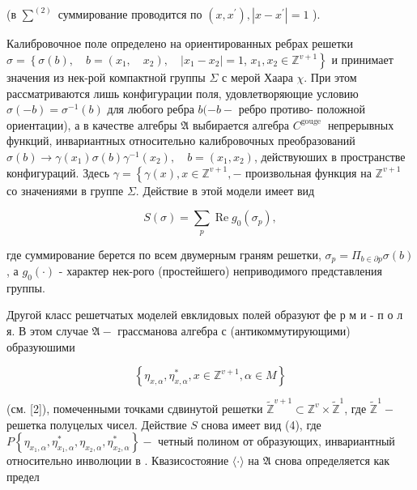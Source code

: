 \documentclass[10pt]{article}
\begin{document}
(в $\sum^{(2)}$ суммирование проводится по $\left(x, x^{\prime}\right),\left|x-x^{\prime}\right|=1$ ).



Калибровочное поле определено на ориентированных ребрах решетки $\sigma=\left\{\sigma(b), \quad b=\left(x_{1}, \quad x_{2}\right), \quad\left|x_{1}-x_{2}\right|=1\right.$, $\left.x_{1}, x_{2} \in \mathbb{Z}^{v+1}\right\}$ и принимает значения из нек-рой компактной группы $\Sigma$ с мерой Хаара $\chi$. При этом рассматриваются лишь конфигурации поля, удовлетворяющие условию $\sigma(-b)=\sigma^{-1}(b)$ для любого ребра $b(-b-$ ребро противо- положной ориентации), а в качестве алгебры $\mathfrak{A}$ выбирается алгебра $C^{\text {gouge }}$ непрерывных функций, инвариантных относительно калибровочных преобразований $\sigma(b) \rightarrow \gamma\left(x_{1}\right) \sigma(b) \gamma^{-1}\left(x_{2}\right), \quad b=\left(x_{1}, x_{2}\right)$, действуюших в пространстве конфигураций. Здесь $\gamma=\left\{\gamma(x), x \in \mathbb{Z}^{v+1},-\right.$ произвольная функция на $\mathbb{Z}^{v+1}$ со значениями в группе $\Sigma$. Действие в этой модели имеет вид



\[

S(\sigma)=\sum_{p} \operatorname{Re} g_{0}\left(\sigma_{p}\right),

\]



где суммирование берется по всем двумерным граням решетки, $\sigma_{p}=\Pi_{b \in \partial p} \sigma(b)$, а $g_{0}(\cdot)$ - характер нек-рого (простейшего) неприводимого представления группы.



Другой класс решетчатых моделей евклидовых полей образуют фе р м и - п о л я. В этом случае $\mathfrak{A}-$ грассманова алгебра с (антикоммутирующими) образуюшими



\[

\left\{\eta_{x, \alpha}, \eta_{x, \alpha}^{*}, x \in \mathbb{Z}^{v+1}, \alpha \in M\right\}

\]



(см. [2]), помеченными точками сдвинутой решетки $\widetilde{\mathbb{Z}}^{v+1} \subset \mathbb{Z}^{v} \times \widetilde{\mathbb{Z}}^{1}$, где $\widetilde{\mathbb{Z}}^{1}-$ решетка полуцелых чисел. Действие $S$ снова имеет вид (4), где $P\left\{\eta_{x_{1}, \alpha}, \eta_{x_{1}, \alpha}^{*}, \eta_{x_{2}, \alpha}, \eta_{x_{2}, \alpha}^{*}\right\}-$ четный полином от образующих, инвариантный относительно инволюции в $\mathfrak{\mathscr { }}$. Квазисостояние $\langle\cdot\rangle$ на $\mathfrak{A}$ снова определяется как предел
\end{document}
